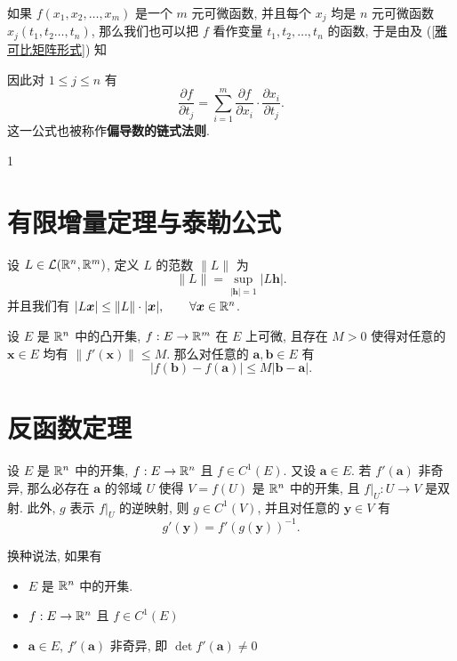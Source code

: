 		\begin{definition}[偏导数的链式法则]\label{偏导数的链式法则}
			如果 $f(x_1,x_2,\ldots,x_m)$ 是一个 $m$ 元可微函数, 并且每个 $x_j$ 均是 $n$ 元可微函数 $x_j(t_1,t_2\ldots,t_n)$, 那么我们也可以把 $f$ 看作变量 $t_1,t_2,\ldots,t_n$ 的函数, 于是由及 (\ref{雅可比矩阵形式}) 知

			因此对 $1\leqslant j\leqslant n$ 有
			\begin{equation}\label{偏导数的链式法则式}
				\frac{\partial f}{\partial t_j} = \sum\limits_{i=1}^m\frac{\partial f}{\partial x_i}\cdot\frac{\partial x_i}{\partial t_j}.
			\end{equation}
			这一公式也被称作\textbf{偏导数的链式法则}.
		\end{definition}

		\begin{definition}[中值定理]
			1
		\end{definition}
	\section{有限增量定理与泰勒公式}
		\begin{definition}[范数]
			设 $L \in \mathcal{L}(\mathbb {R}^{n},\mathbb {R}^{m})$, 定义 $L$ 的范数 $\|L\|$ 为
			$$\|L\|=\sup\limits_{|\bm h |=1}|L\bm h|.$$
			并且我们有 $|L\bm x|\le \|L\|\cdot |\bm x|,  \qquad \forall \bm x \in \mathbb {R}^{n}$.
		\end{definition}

		\begin{theorem}[有限增量定理]
			设 $E$ 是 $\mathbb {R}^{n}$ 中的凸开集, $f:E\to \mathbb {R}^{m}$ 在 $E$ 上可微, 且存在 $M>0$ 使得对任意的 $\bm x \in E$ 均有 $\|f'(\bm x)\| \le M$. 那么对任意的 $\bm a,\bm b \in E$ 有
			$$|f(\bm b)-f(\bm a)|\leqslant M|\bm b-\bm a|.$$
 		\end{theorem}

	\section{反函数定理}
		\begin{theorem}[反函数定理]
			设 $E$ 是 $\mathbb {R}^{n}$ 中的开集, $f:E \to \mathbb {R}^{n}$ 且 $f \in C^1(E)$. 又设 $\bm a \in E$. 若 $f'(\bm a)$ 非奇异, 那么必存在 $\bm a$ 的邻域 $U$ 使得 $V=f(U)$ 是 $\mathbb {R}^{n}$ 中的开集, 且 $f|_U:U\to V$ 是双射. 此外, $g$ 表示 $f|_U$ 的逆映射, 则 $g \in C^1(V)$, 并且对任意的 $\bm y \in V$ 有
			$$g'(\bm y)=f'(g(\bm y))^{-1}.$$
		\end{theorem}


		换种说法, 如果有
		\begin{itemize}[leftmargin=1.5cm]
			\item  $E$ 是 $\mathbb {R}^{n}$ 中的开集.
			\item $f:E\to \mathbb {R}^{n}$ 且 $f \in C^1(E)$
			\item $\bm a \in E$, $f'(\bm a)$ 非奇异, 即 $\det f'(\bm a) \neq 0$
		\end{itemize}

